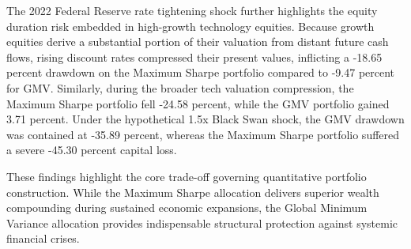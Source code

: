 The 2022 Federal Reserve rate tightening shock further highlights the equity duration risk embedded in high-growth technology equities. Because growth equities derive a substantial portion of their valuation from distant future cash flows, rising discount rates compressed their present values, inflicting a -18.65 percent drawdown on the Maximum Sharpe portfolio compared to -9.47 percent for GMV. Similarly, during the broader tech valuation compression, the Maximum Sharpe portfolio fell -24.58 percent, while the GMV portfolio gained 3.71 percent. Under the hypothetical 1.5x Black Swan shock, the GMV drawdown was contained at -35.89 percent, whereas the Maximum Sharpe portfolio suffered a severe -45.30 percent capital loss.

These findings highlight the core trade-off governing quantitative portfolio construction. While the Maximum Sharpe allocation delivers superior wealth compounding during sustained economic expansions, the Global Minimum Variance allocation provides indispensable structural protection against systemic financial crises.
